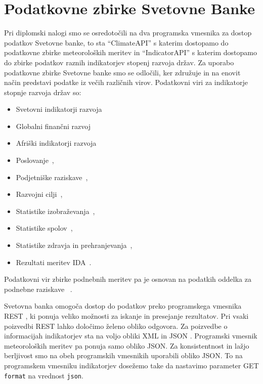 \chapter{Podatkovne zbirke Svetovne Banke}

Pri diplomski nalogi smo se osredotočili na dva programska vmesnika za dostop 
podatkov Svetovne banke, to sta ``ClimateAPI'' s katerim dostopamo do 
podatkovne zbirke meteoroloških meritev in ``IndicatorAPI'' s katerim dostopamo do 
zbirke podatkov raznih indikatorjev stopenj razvoja držav.
Za uporabo podatkovne zbirke Svetovne banke smo se odločili, ker združuje in na
enovit način predstavi podatke iz večih različnih virov. Podatkovni viri za 
indikatorje stopnje razvoja držav so:
\begin{itemize}  
  \item Svetovni indikatorji razvoja~\cite{world_dev_ind} %
  \item Globalni finančni razvoj~\cite{glob_fin_dev}
  \item Afriški indikatorji razvoja~\cite{africa_dev_ind}
  \item Poslovanje~\cite{doing_buseness},
  \item Podjetniške raziskave~\cite{ent_surveys}, 
  \item Razvojni cilji~\cite{mil_dev_goals}, 
  \item Statistike izobraževanja~\cite{edu_stat}, 
  \item Statistike spolov~\cite{gen_stat},
  \item Statistike zdravja in prehranjevanja~\cite{health_pop_stat},
  \item Rezultati meritev IDA~\cite{ida_res_mes_sys}.
\end{itemize}  

Podatkovni vir zbirke podnebnih meritev pa je osnovan na podatkih oddelka
za podnebne raziskave ~\cite{climate_data}.

Svetovna banka omogoča dostop do podatkov preko programskega vmesnika REST , ki
ponuja veliko možnosti za iskanje in presejanje rezultatov. Pri vsaki 
poizvedbi REST lahko določimo želeno obliko odgovora. Za poizvedbe o 
informacijah indikatorjev sta na voljo obliki XML  in JSON . Programski vmesnik 
meteoroloških meritev pa ponuja samo obliko JSON. Za konsistentnost in lažjo
berljivost smo na obeh programskih vmesnikih uporabili obliko JSON. To na
programskem vmesniku indikatorjev dosežemo take da nastavimo parameter GET
\verb|format| na vrednost \verb|json|. 


